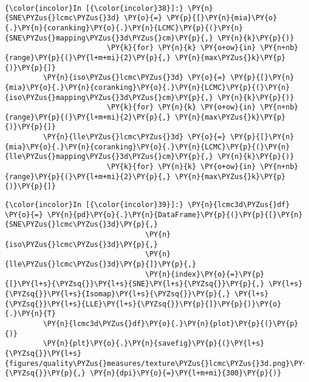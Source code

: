     \begin{center}
    \end{center}
    { \hspace*{\fill} \\}

    \begin{Verbatim}[commandchars=\\\{\}]
{\color{incolor}In [{\color{incolor}38}]:} \PY{n}{SNE\PYZus{}lcmc\PYZus{}3d} \PY{o}{=} \PY{p}{[}\PY{n}{mia}\PY{o}{.}\PY{n}{coranking}\PY{o}{.}\PY{n}{LCMC}\PY{p}{(}\PY{n}{SNE\PYZus{}mapping\PYZus{}3d\PYZus{}cm}\PY{p}{,} \PY{n}{k}\PY{p}{)}
                        \PY{k}{for} \PY{n}{k} \PY{o+ow}{in} \PY{n+nb}{range}\PY{p}{(}\PY{l+m+mi}{2}\PY{p}{,} \PY{n}{max\PYZus{}k}\PY{p}{)}\PY{p}{]}
         \PY{n}{iso\PYZus{}lcmc\PYZus{}3d} \PY{o}{=} \PY{p}{[}\PY{n}{mia}\PY{o}{.}\PY{n}{coranking}\PY{o}{.}\PY{n}{LCMC}\PY{p}{(}\PY{n}{iso\PYZus{}mapping\PYZus{}3d\PYZus{}cm}\PY{p}{,} \PY{n}{k}\PY{p}{)}
                        \PY{k}{for} \PY{n}{k} \PY{o+ow}{in} \PY{n+nb}{range}\PY{p}{(}\PY{l+m+mi}{2}\PY{p}{,} \PY{n}{max\PYZus{}k}\PY{p}{)}\PY{p}{]}
         \PY{n}{lle\PYZus{}lcmc\PYZus{}3d} \PY{o}{=} \PY{p}{[}\PY{n}{mia}\PY{o}{.}\PY{n}{coranking}\PY{o}{.}\PY{n}{LCMC}\PY{p}{(}\PY{n}{lle\PYZus{}mapping\PYZus{}3d\PYZus{}cm}\PY{p}{,} \PY{n}{k}\PY{p}{)}
                        \PY{k}{for} \PY{n}{k} \PY{o+ow}{in} \PY{n+nb}{range}\PY{p}{(}\PY{l+m+mi}{2}\PY{p}{,} \PY{n}{max\PYZus{}k}\PY{p}{)}\PY{p}{]}
\end{Verbatim}

    \begin{Verbatim}[commandchars=\\\{\}]
{\color{incolor}In [{\color{incolor}39}]:} \PY{n}{lcmc3d\PYZus{}df} \PY{o}{=} \PY{n}{pd}\PY{o}{.}\PY{n}{DataFrame}\PY{p}{(}\PY{p}{[}\PY{n}{SNE\PYZus{}lcmc\PYZus{}3d}\PY{p}{,}
                                 \PY{n}{iso\PYZus{}lcmc\PYZus{}3d}\PY{p}{,}
                                 \PY{n}{lle\PYZus{}lcmc\PYZus{}3d}\PY{p}{]}\PY{p}{,}
                                 \PY{n}{index}\PY{o}{=}\PY{p}{[}\PY{l+s}{\PYZsq{}}\PY{l+s}{SNE}\PY{l+s}{\PYZsq{}}\PY{p}{,} \PY{l+s}{\PYZsq{}}\PY{l+s}{Isomap}\PY{l+s}{\PYZsq{}}\PY{p}{,} \PY{l+s}{\PYZsq{}}\PY{l+s}{LLE}\PY{l+s}{\PYZsq{}}\PY{p}{]}\PY{p}{)}\PY{o}{.}\PY{n}{T}
         \PY{n}{lcmc3d\PYZus{}df}\PY{o}{.}\PY{n}{plot}\PY{p}{(}\PY{p}{)}
         \PY{n}{plt}\PY{o}{.}\PY{n}{savefig}\PY{p}{(}\PY{l+s}{\PYZsq{}}\PY{l+s}{figures/quality\PYZus{}measures/texture\PYZus{}lcmc\PYZus{}3d.png}\PY{l+s}{\PYZsq{}}\PY{p}{,} \PY{n}{dpi}\PY{o}{=}\PY{l+m+mi}{300}\PY{p}{)}
\end{Verbatim}

    \begin{center}
    \end{center}
    { \hspace*{\fill} \\}
    
    
